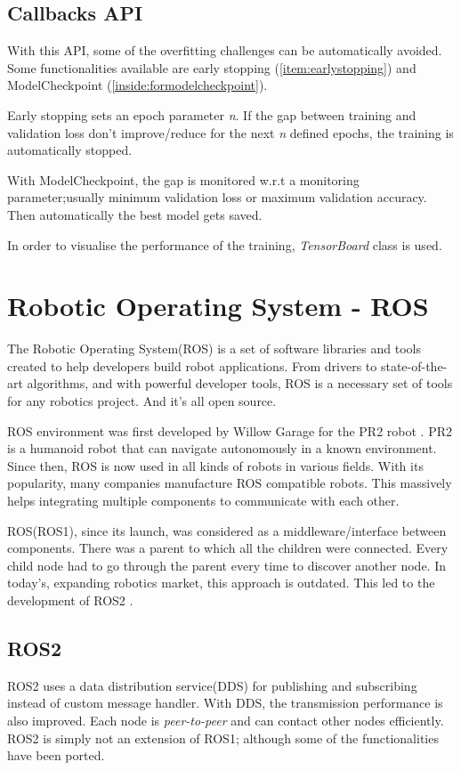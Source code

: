 \subsection{Callbacks API}
With this API, some of the overfitting challenges can be automatically avoided.
Some functionalities available are early stopping (\ref{item:earlystopping}) and
ModelCheckpoint (\ref{inside:formodelcheckpoint}).

Early stopping sets an epoch parameter \textit{n}. If the gap between training and validation loss
don't improve/reduce for the next \textit{n} defined epochs, the training is automatically
stopped.

With ModelCheckpoint, the gap is monitored w.r.t a monitoring parameter;usually minimum validation
loss or maximum validation accuracy. Then automatically the best model gets saved.

In order to visualise the performance of the training, \textit{TensorBoard} class is used.

\section{Robotic Operating System - ROS}
The Robotic Operating System(ROS) \cite{aboutros} is a set of software libraries and tools created to help
developers build robot applications. From drivers to state-of-the-art algorithms, and with powerful developer tools, ROS is a necessary set of tools for any robotics project. And it’s all open source.

ROS environment was first developed by Willow Garage for the PR2 robot \cite{firstros}. PR2 is a humanoid robot that can navigate autonomously in a known environment.
Since then, ROS is now used in all kinds of robots in various fields. With its popularity,
many companies manufacture ROS compatible robots. This massively helps integrating
multiple components to communicate with each other.

ROS(ROS1), since its launch, was considered as a middleware/interface between components. There was a
parent to which all the children were connected. Every child node had to go through the
parent every time to discover another node.  In today's, expanding robotics market,
this approach is outdated. This led to the development of ROS2 \cite{whyros2}.
\subsection{ROS2}
ROS2 uses a data distribution service(DDS) for publishing and subscribing instead of
custom message handler. With DDS, the transmission performance is also improved. Each node
is \textit{peer-to-peer} and can contact other nodes efficiently.
ROS2 is simply not an extension of ROS1; although some of the functionalities have been
ported.


